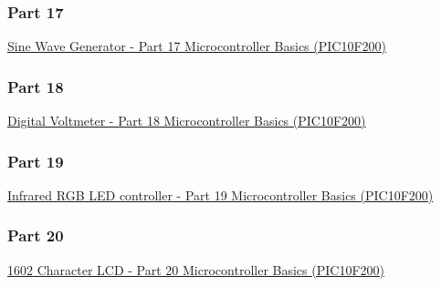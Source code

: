 \documentclass[12pt, letterpaper]{article}
\begin{document}
\subsubsection{Part 17}
\href{https://www.circuitbread.com/tutorials/sine-wave-generator-part-17-microcontroller-basics-pic10f200}{Sine Wave Generator - Part 17 Microcontroller Basics (PIC10F200)}\\
\subsubsection{Part 18}
\href{https://www.circuitbread.com/tutorials/digital-voltmeter-part-18-microcontroller-basics-pic10f200}{Digital Voltmeter - Part 18 Microcontroller Basics (PIC10F200)}\\
\subsubsection{Part 19}
\href{https://www.circuitbread.com/tutorials/infrared-rgb-led-controller-part-19-microcontroller-basics-pic10f200}{Infrared RGB LED controller - Part 19 Microcontroller Basics (PIC10F200)}\\
\subsubsection{Part 20}
\href{https://www.circuitbread.com/tutorials/1602-character-lcd-part-20-microcontroller-basics-pic10f200?token=he8HKfRsVXpEyyyeqTTF}{1602 Character LCD - Part 20 Microcontroller Basics (PIC10F200)}
\end{document}
